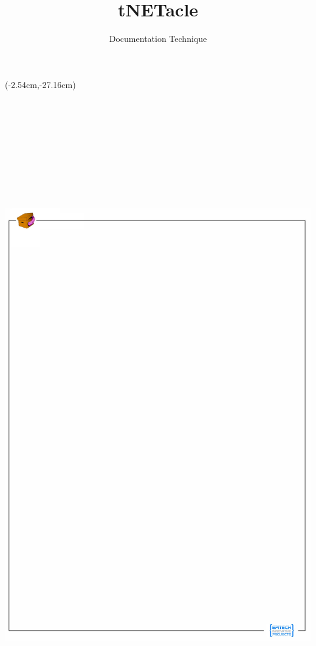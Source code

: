 \documentclass[11pt]{tnetacle-fr}
\title {tNETacle}
\subtitle{Documentation Technique}
\date {}
\begin{document}
\summary{}

\maketitle

\fancyput(-2.54cm,-27.16cm){
\includegraphics[width=21cm,height=29.7cm]{back-tnetacle-eip.jpeg}
}


\tableofcontents


\end{document}

